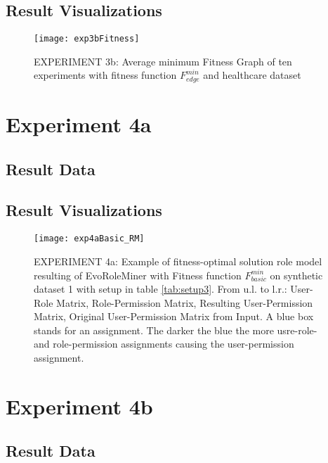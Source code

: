 	\subsection{Result Visualizations}
	\label{sec:A_Exp3b_Diagrams}
		\begin{figure}[H]
			\centering
			\texttt{[image: exp3bFitness]}
			\caption{EXPERIMENT 3b: Average minimum Fitness Graph of ten experiments with fitness function $F_{edge}^{min}$ and healthcare dataset}
			\label{fig:exp3bfitness}
		\end{figure}

\section{Experiment 4a}
\label{sec:A_Exp4a}
	\subsection{Result Data}
	\label{sec:A_Exp4a_Data}
	\subsection{Result Visualizations}
	\label{sec:A_Exp4a_Diagrams}
		\begin{figure}[H]
			\centering
			\texttt{[image: exp4aBasic\_RM]}
			\caption{EXPERIMENT 4a: Example of fitness-optimal solution role model resulting of EvoRoleMiner with Fitness function $F_{basic}^{min}$ on synthetic dataset 1 with setup in table \ref{tab:setup3}. From u.l. to l.r.: User-Role Matrix, Role-Permission Matrix, Resulting User-Permission Matrix, Original User-Permission Matrix from Input. A blue box stands for an assignment. The darker the blue the more usre-role- and role-permission assignments causing the user-permission assignment.}
			\label{fig:exp4aBasic_RM}
		\end{figure}

\section{Experiment 4b}
\label{sec:A_Exp4b}
	\subsection{Result Data}
	\label{sec:A_Exp4b_Data}

